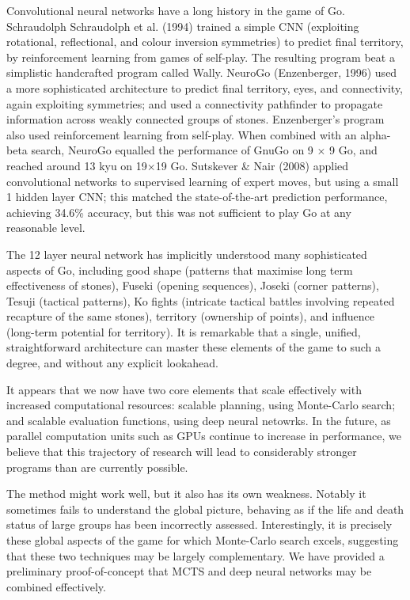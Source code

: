 Convolutional neural networks have a long history in the game of Go. Schraudolph Schraudolph
et al. (1994) trained a simple CNN (exploiting rotational, reflectional, and colour inversion symmetries)
to predict final territory, by reinforcement learning from games of self-play. The resulting
program beat a simplistic handcrafted program called Wally. NeuroGo (Enzenberger, 1996) used
a more sophisticated architecture to predict final territory, eyes, and connectivity, again exploiting
symmetries; and used a connectivity pathfinder to propagate information across weakly connected
groups of stones. Enzenberger's program also used reinforcement learning from self-play. When
combined with an alpha-beta search, NeuroGo equalled the performance of GnuGo on 9 $\times$ 9 Go,
and reached around 13 kyu on 19$\times$19 Go. Sutskever \& Nair (2008) applied convolutional networks
to supervised learning of expert moves, but using a small 1 hidden layer CNN; this matched
the state-of-the-art prediction performance, achieving 34.6\% accuracy, but this was not sufficient to
play Go at any reasonable level.

The 12 layer neural network has implicitly understood many sophisticated aspects of Go, including good
shape (patterns that maximise long term effectiveness of stones), Fuseki (opening sequences), Joseki
(corner patterns), Tesuji (tactical patterns), Ko fights (intricate tactical battles involving repeated
recapture of the same stones), territory (ownership of points), and influence (long-term potential
for territory). It is remarkable that a single, unified, straightforward architecture can master these
elements of the game to such a degree, and without any explicit lookahead.

It appears that we now have two core elements that scale effectively with increased computational resources: scalable planning, using Monte-Carlo search; and scalable evaluation functions, using deep neural netowrks. In the future, as parallel computation units such as GPUs continue to increase in performance, we believe that this trajectory of research will lead to considerably stronger programs than are currently possible.

The method might work well, but it also has its own weakness. Notably it sometimes fails to understand the global picture, behaving as if the life and death status of large groups has been incorrectly assessed. Interestingly, it is precisely these global aspects of the game for which Monte-Carlo search excels, suggesting that these two techniques may be largely complementary. We have provided a preliminary proof-of-concept that MCTS and deep neural networks may be combined effectively.
